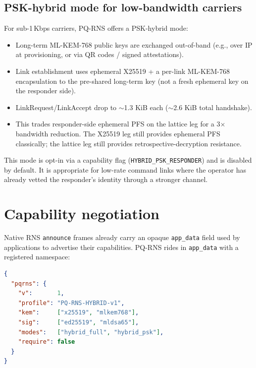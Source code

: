 \documentclass[11pt,a4paper]{article}
\begin{document}
\subsection{PSK-hybrid mode for low-bandwidth carriers}

For sub-1\,Kbps carriers, PQ-RNS offers a PSK-hybrid mode:

\begin{itemize}[leftmargin=*,itemsep=0pt]
\item Long-term ML-KEM-768 public keys are exchanged out-of-band
  (e.g., over IP at provisioning, or via QR codes / signed
  attestations).
\item Link establishment uses ephemeral X25519 + a per-link ML-KEM-768
  encapsulation to the pre-shared long-term key (not a fresh
  ephemeral key on the responder side).
\item LinkRequest/LinkAccept drop to $\sim$1.3 KiB each
  ($\sim$2.6 KiB total handshake).
\item This trades responder-side ephemeral PFS on the lattice leg for
  a 3$\times$ bandwidth reduction. The X25519 leg still provides
  ephemeral PFS classically; the lattice leg still provides
  retrospective-decryption resistance.
\end{itemize}

This mode is opt-in via a capability flag (\texttt{HYBRID\_PSK\_RESPONDER})
and is disabled by default. It is appropriate for low-rate command
links where the operator has already vetted the responder's identity
through a stronger channel.

\section{Capability negotiation}
\label{sec:capabilities}

Native RNS \texttt{announce} frames already carry an opaque
\texttt{app\_data} field used by applications to advertise their
capabilities. PQ-RNS rides in \texttt{app\_data} with a registered
namespace:

\begin{lstlisting}[language=json,caption={app\_data PQ-RNS capability block.}]
{
  "pqrns": {
    "v":       1,
    "profile": "PQ-RNS-HYBRID-v1",
    "kem":     ["x25519", "mlkem768"],
    "sig":     ["ed25519", "mldsa65"],
    "modes":   ["hybrid_full", "hybrid_psk"],
    "require": false
  }
}
\end{lstlisting}
\end{document}
